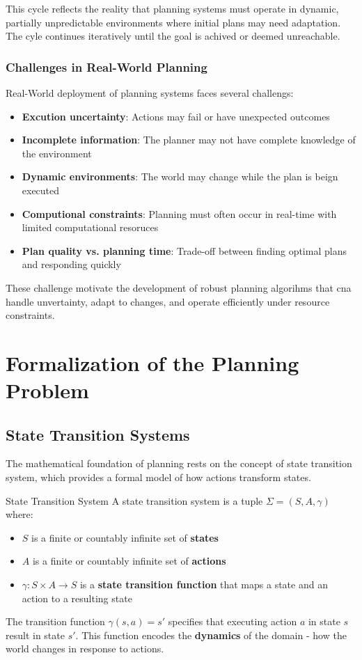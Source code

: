 \documentclass[a4paper]{article}
\theoremstyle{definition}
\begin{document}
This cycle reflects the reality that planning systems must operate in dynamic, partially unpredictable environments where
initial plans may need adaptation. The cyle continues iteratively until the goal is achived or deemed unreachable.
\subsubsection{Challenges in Real-World Planning}
Real-World deployment of planning systems faces several challengs:
\begin{itemize}
    \item \textbf{Excution uncertainty}: Actions may fail or have unexpected outcomes
    \item \textbf{Incomplete information}: The planner may not have complete knowledge of the environment
    \item \textbf{Dynamic environments}: The world may change while the plan is beign executed
    \item \textbf{Computional constraints}: Planning must often occur in real-time with limited computational resoruces 
    \item \textbf{Plan quality vs. planning time}: Trade-off between finding optimal plans and responding quickly
\end{itemize}
These challenge motivate the development of robust planning algorihms that cna handle unvertainty, adapt to changes,
and operate efficiently under resource constraints.
\section{Formalization of the Planning Problem}
\subsection{State Transition Systems}
The mathematical foundation of planning rests on the concept of state transition system, which provides a formal model of 
how actions transform states.

\begin{definition}{State Transition System}
A state transition system is a tuple \( \Sigma = (S,A,\gamma) \) where:
\begin{itemize}
    \item \( S \) is a finite or countably infinite set of \textbf{states}
    \item \( A \) is a finite or countably infinite set of \textbf{actions}
    \item \( \gamma : S \times A \rightarrow S \) is a \textbf{state transition function} that maps a state and an action to a resulting state
\end{itemize}
\end{definition}
The transition function \( \gamma(s,a) = s' \) specifies that executing action \( a \) in state \( s \) result in state
\( s' \). This function encodes the \textbf{dynamics} of the domain - how the world changes in response to actions.
\end{document}
